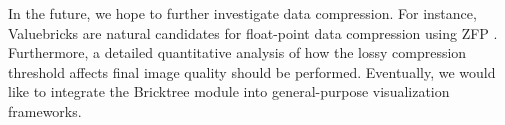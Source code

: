 
In the future, we hope to further investigate data compression.  
For instance, Valuebricks are natural candidates for float-point data compression using ZFP
\cite{lindstrom2014fixed}.
Furthermore, a detailed quantitative analysis of how the lossy compression
threshold affects final image quality should be performed. 
Eventually, we would like to integrate the Bricktree module into
general-purpose visualization frameworks. 





%

%
%
%




